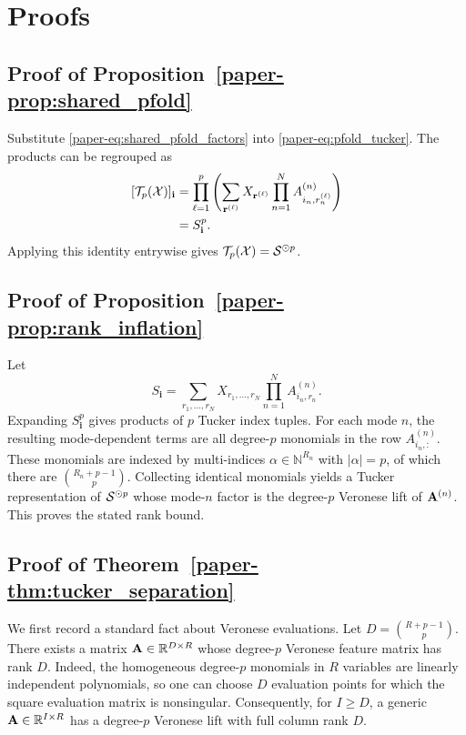 \section{Proofs}
\label{supp:proofs}

\subsection{Proof of Proposition~\ref{paper-prop:shared_pfold}}

Substitute \eqref{paper-eq:shared_pfold_factors} into
\eqref{paper-eq:pfold_tucker}. The products can be regrouped as
\[
\begin{aligned}
  [\mathcal{T}_p(\cX)]_{\mathbf{i}}
  &=
  \prod_{\ell=1}^{p}
  \left(
  \sum_{\mathbf r^{(\ell)}}
  X_{\mathbf r^{(\ell)}}
  \prod_{n=1}^{N}A^{(n)}_{i_n,r_n^{(\ell)}}
  \right) \\
  &= S_{\mathbf i}^{p}.
\end{aligned}
\]
Applying this identity entrywise gives
$\mathcal{T}_p(\mathcal{X})=\mathcal{S}^{\odot p}$.

\subsection{Proof of Proposition~\ref{paper-prop:rank_inflation}}

Let
\[
  S_{\mathbf{i}}
  =
  \sum_{r_1,\ldots,r_N}
  X_{r_1,\ldots,r_N}
  \prod_{n=1}^{N}A^{(n)}_{i_n,r_n}.
\]
Expanding $S_{\mathbf{i}}^p$ gives products of $p$ Tucker index tuples. For
each mode $n$, the resulting mode-dependent terms are all degree-$p$ monomials
in the row $A^{(n)}_{i_n,:}$. These monomials are indexed by multi-indices
$\alpha\in\mathbb{N}^{R_n}$ with $|\alpha|=p$, of which there are
$\binom{R_n+p-1}{p}$. Collecting identical monomials yields a Tucker
representation of $\mathcal{S}^{\odot p}$ whose mode-$n$ factor is the degree-$p$
Veronese lift of $\mathbf{A}^{(n)}$. This proves the stated rank bound.

\subsection{Proof of Theorem~\ref{paper-thm:tucker_separation}}

We first record a standard fact about Veronese evaluations. Let
\(D=\binom{R+p-1}{p}\). There exists a matrix \(\mathbf{A}\in\mathbb{R}^{D\times R}\) whose
degree-\(p\) Veronese feature matrix has rank \(D\). Indeed, the homogeneous
degree-\(p\) monomials in \(R\) variables are linearly independent
polynomials, so one can choose \(D\) evaluation points for which the square
evaluation matrix is nonsingular. Consequently, for \(I\ge D\), a generic
\(\mathbf{A}\in\mathbb{R}^{I\times R}\) has a degree-\(p\) Veronese lift with full column
rank \(D\).

